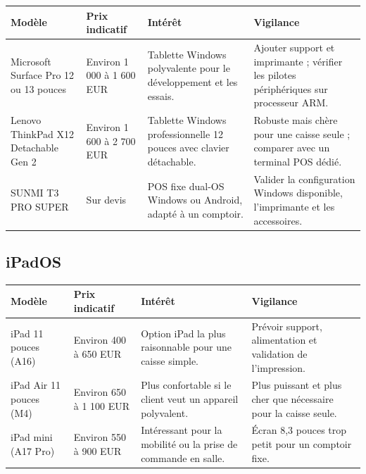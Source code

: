 \documentclass[11pt,a4paper]{article}
\begin{document}
\begin{tabularx}{\textwidth}{L{3.2cm} L{2.45cm} Y L{3.35cm}}
  \toprule
  \color{white}\textbf{Modèle} &
  \color{white}\textbf{Prix indicatif} &
  \color{white}\textbf{Intérêt} &
  \color{white}\textbf{Vigilance} \\
  \midrule
  Microsoft Surface Pro 12 ou 13 pouces &
  Environ 1 000 à 1 600 EUR &
  Tablette Windows polyvalente pour le développement et les essais. &
  Ajouter support et imprimante ; vérifier les pilotes périphériques sur processeur ARM. \\
  Lenovo ThinkPad X12 Detachable Gen 2 &
  Environ 1 600 à 2 700 EUR &
  Tablette Windows professionnelle 12 pouces avec clavier détachable. &
  Robuste mais chère pour une caisse seule ; comparer avec un terminal POS dédié. \\
  SUNMI T3 PRO SUPER &
  Sur devis &
  POS fixe dual-OS Windows ou Android, adapté à un comptoir. &
  Valider la configuration Windows disponible, l'imprimante et les accessoires. \\
  \bottomrule
\end{tabularx}

\subsection{iPadOS}

\begin{tabularx}{\textwidth}{L{3.2cm} L{2.45cm} Y L{3.35cm}}
  \toprule
  \color{white}\textbf{Modèle} &
  \color{white}\textbf{Prix indicatif} &
  \color{white}\textbf{Intérêt} &
  \color{white}\textbf{Vigilance} \\
  \midrule
  iPad 11 pouces (A16) &
  Environ 400 à 650 EUR &
  Option iPad la plus raisonnable pour une caisse simple. &
  Prévoir support, alimentation et validation de l'impression. \\
  iPad Air 11 pouces (M4) &
  Environ 650 à 1 100 EUR &
  Plus confortable si le client veut un appareil polyvalent. &
  Plus puissant et plus cher que nécessaire pour la caisse seule. \\
  iPad mini (A17 Pro) &
  Environ 550 à 900 EUR &
  Intéressant pour la mobilité ou la prise de commande en salle. &
  Écran 8,3 pouces trop petit pour un comptoir fixe. \\
  \bottomrule
\end{tabularx}
\end{document}
